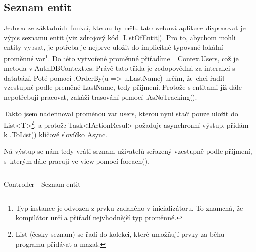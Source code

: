\documentclass[a4paper, 12pt]{report}
\begin{document}
	\subsection{Seznam entit} \label{Seznam_entit}
	Jednou ze základních funkcí, kterou by měla tato webová aplikace disponovat je výpis seznamu entit (viz zdrojový kód \ref{ListOfEntit}). Pro to, abychom mohli entity vypsat, je potřeba je nejprve uložit do implicitně typované lokální proměnné var\footnote{Typ instance je odvozen z prvku zadaného v inicializátoru. To znamená, že kompilátor určí a přiřadí nejvhodnější typ proměnné.}. Do této vytvořené proměnné přiřadíme \_Contex.Users, což je metoda v AuthDBContext.cs. Právě tato třída je zodopovědná za interakci s databází. Poté pomocí .OrderBy(u => u.LastName) určím, že~chci řadit vzestupně podle proměné LastName, tedy příjmení. Protože s entitami již dále nepotřebuji pracovat, zakáži trasování pomocí .AsNoTracking().\par
	Takto jsem nadefinoval proměnou var users, kterou nyní stačí pouze uložit do List<T>\footnote{List (česky seznam) se řadí do kolekci, které umožňují prvky za běhu programu přidávat a mazat.}, a protože Task<IActionResul> požaduje asynchronní výstup, přidám k .ToList() klíčové slovíčko Async.\par
	Ná výstup se nám tedy vráti seznam uživatelů seřazený vzestupně podle příjmení, s~kterým dále pracuji ve view pomocí foreach().
	\begin{listing}[H]
		\inputminted{csharp}{SourceCode/Controllers/ListOfEntit.cs}
		\caption{Controller - Seznam entit}
		\label{ListOfEntit}
	\end{listing}
\end{document}
